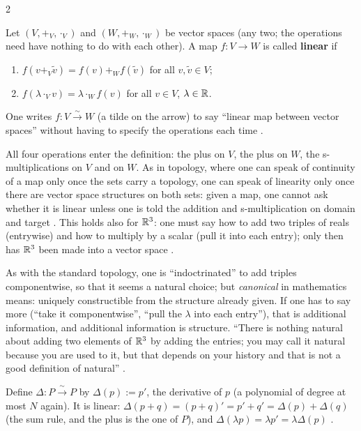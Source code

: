 \begin{paracol}{2}
\begin{definition}\label{def:c03-linear}
Let $(V,+_V,\cdot_V)$ and $(W,+_W,\cdot_W)$ be vector spaces (any two; the operations need have nothing to do with each other). A map $f\colon V\to W$ is called \textbf{linear} if
\begin{enumerate}
  \item $f(v+_V\tilde v)=f(v)+_Wf(\tilde v)$ for all $v,\tilde v\in V$;
  \item $f(\lambda\cdot_V v)=\lambda\cdot_W f(v)$ for all $v\in V$, $\lambda\in\mathbb{R}$.
\end{enumerate}
One writes $f\colon V\xrightarrow{\ \sim\ }W$ (a tilde on the arrow) to say ``linear map between vector spaces'' without having to specify the operations each time
.
\end{definition}
All four operations enter the definition: the plus on $V$, the plus on $W$, the s-multiplications on $V$ and on $W$. As in topology, where one can speak of continuity of a map only once the sets carry a topology, one can speak of linearity only
once there are vector space structures on both sets: given a map, one cannot ask whether it is linear unless one is told the addition and s-multiplication on domain and target .
This holds also for $\mathbb{R}^3$: one must say how to add two triples of reals (entrywise) and how to multiply by a scalar (pull it into each entry); only then has $\mathbb{R}^3$ been made into a vector space .
\begin{coursenote}
As with the standard topology, one is ``indoctrinated'' to add triples componentwise, so that it seems a natural choice; but \emph{canonical} in mathematics means: uniquely constructible from the structure already given. If one has to say more (``take it
componentwise'', ``pull the $\lambda$ into each entry''), that is additional information, and additional information is structure. ``There is nothing natural about adding two elements of $\mathbb{R}^3$ by adding the entries; you may call it natural because you are used to it, but that
depends on your history and that is not a good definition of natural'' .
\end{coursenote}

\begin{example}[Differentiation on $P$]\label{ex:c03-delta}
Define $\Delta\colon P\xrightarrow{\ \sim\ }P$ by $\Delta(p):=p'$, the derivative of $p$ (a polynomial of degree at most $N$ again). It is linear: $\Delta(p+q)=(p+q)'=p'+q'=\Delta(p)+\Delta(q)$ (the sum rule, and the plus is the one of $P$), and $\Delta(\lambda p)=\lambda p'=\lambda\Delta(p)$
.
\end{example}


\end{paracol}

